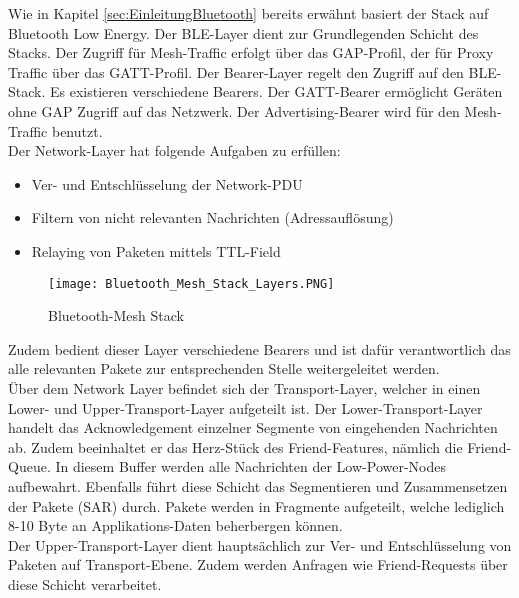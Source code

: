 Wie in Kapitel \ref{sec:EinleitungBluetooth} bereits erwähnt basiert der Stack auf Bluetooth Low Energy. Der BLE-Layer dient zur Grundlegenden Schicht des Stacks. Der Zugriff für Mesh-Traffic erfolgt über das GAP-Profil, der für Proxy Traffic über das GATT-Profil. Der Bearer-Layer regelt den Zugriff auf den BLE-Stack. Es existieren verschiedene Bearers. Der GATT-Bearer ermöglicht Geräten ohne GAP Zugriff auf das Netzwerk. Der Advertising-Bearer wird für den Mesh-Traffic benutzt. \\

Der Network-Layer hat folgende Aufgaben zu erfüllen: 

\begin{itemize}
	\item Ver- und Entschlüsselung der Network-PDU
	\item Filtern von nicht relevanten Nachrichten (Adressauflösung)
	\item Relaying von Paketen mittels TTL-Field
\end{itemize}

\begin{wrapfigure}{r}{0.5\textwidth}
	\centering
	\texttt{[image: Bluetooth\_Mesh\_Stack\_Layers.PNG]}
	\caption{Bluetooth-Mesh Stack \cite{bluetooth_sig_mesh-technology-overviewpdf_2020}} 
	\label{fig:BTMeshStack}
\end{wrapfigure}

Zudem bedient dieser Layer verschiedene Bearers und ist dafür verantwortlich das alle relevanten Pakete zur entsprechenden Stelle weitergeleitet werden. \\

Über dem Network Layer befindet sich der Transport-Layer, welcher in einen Lower- und Upper-Transport-Layer aufgeteilt ist. Der Lower-Transport-Layer handelt das Acknowledgement einzelner Segmente von eingehenden Nachrichten ab. Zudem beeinhaltet er das Herz-Stück des Friend-Features, nämlich die Friend-Queue. In diesem Buffer werden alle Nachrichten der  Low-Power-Nodes aufbewahrt. Ebenfalls führt diese Schicht das Segmentieren und Zusammensetzen der Pakete (SAR) durch. Pakete werden in Fragmente aufgeteilt, welche lediglich 8-10 Byte an Applikations-Daten beherbergen können. \\

Der Upper-Transport-Layer dient hauptsächlich zur Ver- und Entschlüsselung von Paketen auf Transport-Ebene. Zudem werden Anfragen wie Friend-Requests über diese Schicht verarbeitet. \\

